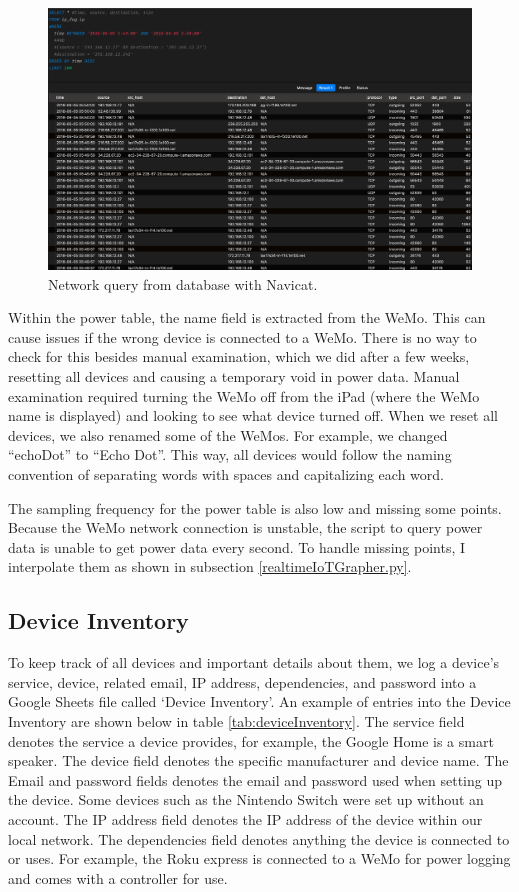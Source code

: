 \begin{figure}[H]
    \centering
    \includegraphics[width=1\textwidth]{figures/navicatNetworkQuery.png}
    \caption{Network query from database with Navicat.}
    \label{fig:navicatNetworkQuery}
\end{figure}

Within the power table, the name field is extracted from the WeMo. This can cause issues if the wrong device is connected to a WeMo. There is no way to check for this besides manual examination, which we did after a few weeks, resetting all devices and causing a temporary void in power data. Manual examination required turning the WeMo off from the iPad (where the WeMo name is displayed) and looking to see what device turned off. When we reset all devices, we also renamed some of the WeMos. For example, we changed ``echoDot'' to ``Echo Dot''. This way, all devices would follow the naming convention of separating words with spaces and capitalizing each word.

The sampling frequency for the power table is also low and missing some points. Because the WeMo network connection is unstable, the script to query power data is unable to get power data every second. To handle missing points, I interpolate them as shown in subsection \ref{realtimeIoTGrapher.py}.

\subsection{Device Inventory}
\label{Device Inventory}
To keep track of all devices and important details about them, we log a device's service, device, related email, IP address, dependencies, and password into a Google Sheets file called `Device Inventory'. An example of entries into the Device Inventory are shown below in table \ref{tab:deviceInventory}. The service field denotes the service a device provides, for example, the Google Home is a smart speaker. The device field denotes the specific manufacturer and device name. The Email and password fields denotes the email and password used when setting up the device. Some devices such as the Nintendo Switch were set up without an account. The IP address field denotes the IP address of the device within our local network. The dependencies field denotes anything the device is connected to or uses. For example, the Roku express is connected to a WeMo for power logging and comes with a controller for use.

